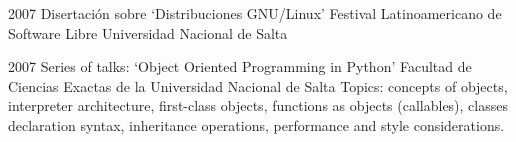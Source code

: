 \documentclass[11pt,a4paper]{moderncv}
\begin{document}
\cventry                                                                                                          %
    {2007}                                                                                                        %
    {Disertación sobre `Distribuciones GNU/Linux'}                                                                %
    {Festival Latinoamericano de Software Libre}                                                                  %
    {Universidad Nacional de Salta}                                                                               %
    {}                                                                                                            %
    {}                                                                                                            %

\cventry                                                                                                          %
    {2007}                                                                                                        %
    {Series of talks: `Object Oriented Programming in Python'}                                                    %
    {Facultad de Ciencias Exactas de la Universidad Nacional de Salta}                                            %
    {}                                                                                                            %
    {}                                                                                                            %
    {                                                                                                             %
        Topics:                                                                                                   %
        concepts of objects,                                                                                      %
        interpreter architecture,                                                                                 %
        first-class objects,                                                                                      %
        functions as objects (callables),                                                                         %
        classes declaration syntax,                                                                               %
        inheritance operations,                                                                                   %
        performance and style considerations.                                                                     %
    }                                                                                                             %
\end{document}
